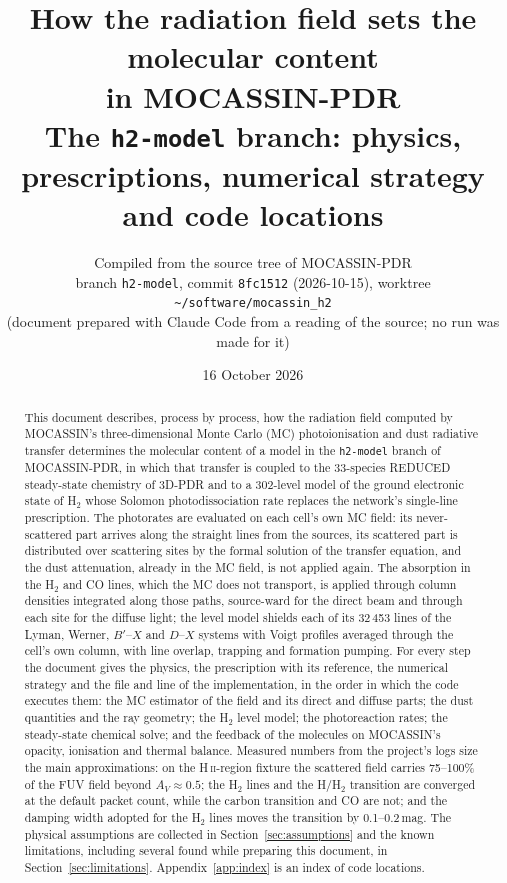 \documentclass[11pt,a4paper]{article}
\title{How the radiation field sets the molecular content\\ in MOCASSIN-PDR\\[6pt]
\large The \texttt{h2-model} branch: physics, prescriptions, numerical strategy\\ and code locations}
\author{Compiled from the source tree of MOCASSIN-PDR\\
\small branch \texttt{h2-model}, commit \texttt{8fc1512} (2026-10-15),
worktree \texttt{\textasciitilde/software/mocassin\_h2}\\
\small (document prepared with Claude Code from a reading of the source; no run was made for it)}
\date{16 October 2026}
\newcommand{\Htwo}{H\ensuremath{_2}}
\newcommand{\AV}{A_{V}}
\begin{document}
\maketitle
\thispagestyle{empty}

\begin{abstract}
\noindent
This document describes, process by process, how the radiation field computed by
MOCASSIN's three-dimensional Monte Carlo (MC) photoionisation and dust radiative
transfer determines the molecular content of a model in the \texttt{h2-model} branch
of MOCASSIN-PDR, in which that transfer is coupled to the 33-species REDUCED
steady-state chemistry of 3D-PDR and to a 302-level model of the ground electronic
state of \Htwo{} whose Solomon photodissociation rate replaces the network's
single-line prescription. The photorates are evaluated on each cell's own MC field:
its never-scattered part arrives along the straight lines from the sources, its
scattered part is distributed over scattering sites by the formal solution of the
transfer equation, and the dust attenuation, already in the MC field, is not applied
again. The absorption in the \Htwo{} and CO lines, which the MC does not transport,
is applied through column densities integrated along those paths, source-ward for the
direct beam and through each site for the diffuse light; the level model shields each
of its 32\,453 lines of the Lyman, Werner, $B'$--$X$ and $D$--$X$ systems with Voigt
profiles averaged through the cell's own column, with line overlap, trapping and
formation pumping. For every step the document gives the physics, the prescription
with its reference, the numerical strategy and the file and line of the
implementation, in the order in which the code executes them: the MC estimator of the
field and its direct and diffuse parts; the dust quantities and the ray geometry; the
\Htwo{} level model; the photoreaction rates; the steady-state chemical solve; and the
feedback of the molecules on MOCASSIN's opacity, ionisation and thermal balance.
Measured numbers from the project's logs size the main approximations: on the
H\,\textsc{ii}-region fixture the scattered field carries 75--100\% of the FUV field
beyond $\AV\approx0.5$; the \Htwo{} lines and the H/\Htwo{} transition are converged
at the default packet count, while the carbon transition and CO are not; and the
damping width adopted for the \Htwo{} lines moves the transition by 0.1--0.2\,mag.
The physical assumptions are collected in Section~\ref{sec:assumptions} and the known
limitations, including several found while preparing this document, in
Section~\ref{sec:limitations}. Appendix~\ref{app:index} is an index of code locations.
\end{abstract}
\end{document}
